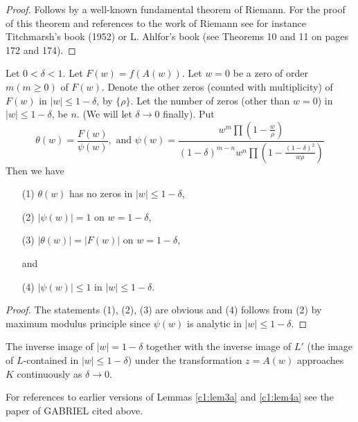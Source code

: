 \begin{proof}
Follows by a well-known fundamental theorem of Riemann. For the proof of this theorem and references to the work of Riemann see for instance Titchmarsh's book \cite{Titchmarsh2} (1952) or L. Ahlfor's book \cite{Ahlfors1} (see Theorems 10 and 11 on pages 172 and 174).
\end{proof}

\begin{lem}\label{c1:lem3a}
Let $0 < \delta < 1$. Let $F(w) = f(A(w))$. Let $w = 0$ be a zero of order\pageoriginale $m(m \geq 0)$ of $F(w)$. Denote the other zeros (counted with multiplicity) of $F(w)$ in $|w| \leq 1 - \delta$, by $\{\rho\}$. Let the number of zeros (other than $w = 0$) in $|w| \leq 1-\delta$, be $n$. (We will let $\delta\to 0$ finally). Put
$$
\theta(w) = \frac{F(w)}{\psi(w)}, \text{ and } \psi (w) = \frac{w^m \prod \left(1-\frac{w}{\rho} \right)}{(1-\delta)^{m-n} w^n \prod \left(1-\frac{(1-\delta)^2}{w\bar{\rho}}\right)}
$$
Then we have
\begin{itemize}
\item[{\rm (1)}] $\theta(w)$ has no zeros in $|w| \leq 1-\delta$, 

\item[{\rm (2)}] $|\psi(w)| =1$ on $w = 1 -\delta$,

\item[{\rm (3)}] $|\theta(w)| = |F(w)|$ on $w = 1 -\delta$,

and

\item[{\rm (4)}] $|\psi(w)| \leq 1$ in $|w| \leq 1 -\delta$.
\end{itemize}
\end{lem}

\begin{proof}
The statements (1), (2), (3) are obvious and (4) follows from (2) by maximum modulus  principle since $\psi(w)$ is analytic in $|w| \leq 1 -\delta$. 
\end{proof}

\begin{lem}\label{c1:lem4a}
The inverse image of $|w| =1-\delta$ together with the inverse image of $L'$ (the image of $L$-contained in $|w| \leq 1 -\delta$) under the transformation $z = A(w)$ approaches $K$ continuously as $\delta \to 0$.
\end{lem}

\begin{remark*}
For references to earlier versions of Lemmas \ref{c1:lem3a} and \ref{c1:lem4a} see the paper of GABRIEL cited above.
\end{remark*}

